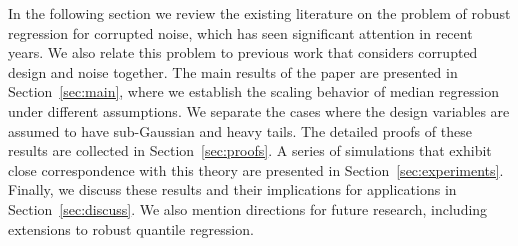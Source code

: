 In the following section we review the existing literature on the problem of robust regression for corrupted noise, which has seen significant attention in recent years. We also relate this problem to previous work that considers corrupted design and noise together. The main results of the paper are presented in Section~\ref{sec:main}, where we establish the scaling behavior of median regression under different assumptions. We separate the cases where the design variables are assumed to have sub-Gaussian and heavy tails. The detailed proofs of these results are collected in Section~\ref{sec:proofs}. A series of simulations that exhibit close correspondence with this theory are presented in Section~\ref{sec:experiments}. Finally, we discuss these results and their implications for applications in Section~\ref{sec:discuss}. We also mention directions for future research, including extensions to robust quantile regression.

